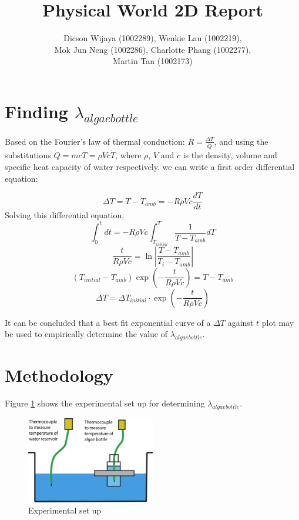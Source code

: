 \documentclass[10pt,a4paper]{IEEEtran}
\author{Dicson Wijaya (1002289), Wenkie Lau (1002219), \\ Mok Jun Neng (1002286), Charlotte Phang (1002277),\\ Martin Tan (1002173)}
\title{Physical World 2D Report}
\begin{document}
	\maketitle
	\section{Finding $\lambda_{algae bottle}$}
	Based on the Fourier's law of thermal conduction: $R = \frac{\Delta T}{\dot{Q}}$, and using the substitutions $\dot{Q} = mc \dot{T} = \rho V c \dot{T}$, where $\rho$, $V$ and $c$ is the density, volume and specific heat capacity of water respectively. we can write a first order differential equation:
		
	$$\Delta T = T - T_{amb} = -R \rho V c \frac{dT}{dt}$$
	Solving this differential equation,
	$$\int_{0}^{t} dt = -R \rho V c \int_{T_{initial}}^{T}\frac{1}{T-T_{amb}} dT$$
	$$\frac{t}{R \rho V c} = \ln \left| \frac{T - T_{amb}}{T_i - T_{amb}} \right|$$
	$$\left( T_{initial} - T_{amb} \right) \exp(-\frac{t}{R \rho V c}) = T - T_{amb}$$
	$$\Delta T = \Delta T_{initial} \cdot \exp(-\frac{t}{R \rho V c})$$
	
	It can be concluded that a best fit exponential curve of a $\Delta T$ against $t$ plot may be used to empirically determine the value of $\lambda_{algae bottle}$.
	\section{Methodology}
	Figure \ref{fig:methodology} shows the experimental set up for determining $\lambda_{algae bottle}$.
	
 	\begin{figure}[H]
 		\begin{center}
 			\includegraphics[width=0.5\textwidth]{methodology.png}
 			\caption{Experimental set up}
 			\label{fig:methodology}
 		\end{center}
 	\end{figure} 
	
\end{document}
